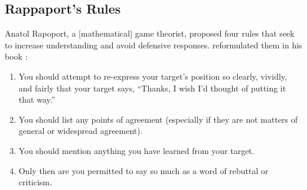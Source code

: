 \subsection{Rappaport's Rules}%
\label{sec:rappaports-rules}\indent%

Anatol Rapoport, a [mathematical] game theorist, proposed four rules that seek to increase understanding and avoid defensive responses.  reformulated them in his book  \parencite{Dennett2013}:
\begin{enumerate}[topsep=0.3\baselineskip,itemsep=0.25\baselineskip]
  \item You should attempt to re-express your target’s position so clearly, vividly, and fairly that your target says, “Thanks, I wish I’d thought of putting it that way.”
  \item You should list any points of agreement (especially if they are not matters of general or widespread agreement).
  \item You should mention anything you have learned from your target.
  \item Only then are you permitted to say so much as a word of rebuttal or criticism.
\end{enumerate}
\medskip

